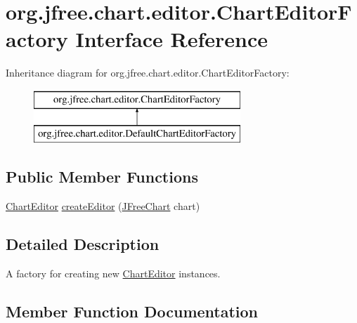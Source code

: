 \hypertarget{interfaceorg_1_1jfree_1_1chart_1_1editor_1_1_chart_editor_factory}{}\section{org.\+jfree.\+chart.\+editor.\+Chart\+Editor\+Factory Interface Reference}
\label{interfaceorg_1_1jfree_1_1chart_1_1editor_1_1_chart_editor_factory}
Inheritance diagram for org.\+jfree.\+chart.\+editor.\+Chart\+Editor\+Factory\+:\begin{figure}[H]
\begin{center}
\leavevmode
\includegraphics[height=2.000000cm]{interfaceorg_1_1jfree_1_1chart_1_1editor_1_1_chart_editor_factory}
\end{center}
\end{figure}
\subsection*{Public Member Functions}
\begin{DoxyCompactItemize}
\item 
\mbox{\hyperlink{interfaceorg_1_1jfree_1_1chart_1_1editor_1_1_chart_editor}{Chart\+Editor}} \mbox{\hyperlink{interfaceorg_1_1jfree_1_1chart_1_1editor_1_1_chart_editor_factory_aa5f9eeb23f352c7555ffad94af60c344}{create\+Editor}} (\mbox{\hyperlink{classorg_1_1jfree_1_1chart_1_1_j_free_chart}{J\+Free\+Chart}} chart)
\end{DoxyCompactItemize}


\subsection{Detailed Description}
A factory for creating new \mbox{\hyperlink{interfaceorg_1_1jfree_1_1chart_1_1editor_1_1_chart_editor}{Chart\+Editor}} instances. 

\subsection{Member Function Documentation}
\mbox{\label{interfaceorg_1_1jfree_1_1chart_1_1editor_1_1_chart_editor_factory_aa5f9eeb23f352c7555ffad94af60c344}} 
